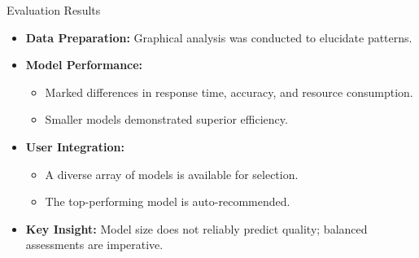 \documentclass{beamer}
\begin{document}
\begin{frame}{Evaluation Results}
  \begin{itemize}
    \item \textbf{Data Preparation:} Graphical analysis was conducted to elucidate patterns.
    \item \textbf{Model Performance:}
      \begin{itemize}
        \item Marked differences in response time, accuracy, and resource consumption.
        \item Smaller models demonstrated superior efficiency.
      \end{itemize}
    \item \textbf{User Integration:}
      \begin{itemize}
        \item A diverse array of models is available for selection.
        \item The top-performing model is auto-recommended.
      \end{itemize}
    \item \textbf{Key Insight:} Model size does not reliably predict quality; balanced assessments are imperative.
  \end{itemize}
\end{frame}


\end{document}
